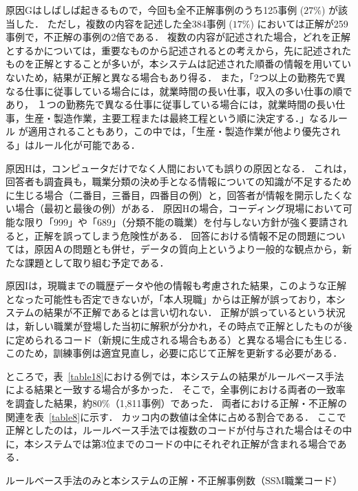 \documentclass[japanese]{jnlp_1.4}
\begin{document}
原因Gはしばしば起きるもので，今回も全不正解事例のうち125事例 ($27\%$) が該当した．
ただし，複数の内容を記述した全384事例 ($17\%$) においては正解が259事例で，不正解の事例の2倍である． 
複数の内容が記述された場合，どれを正解とするかについては，重要なものから記述されるとの考えから，先に記述されたものを正解とすることが多いが，本システムは記述された順番の情報を用いていないため，結果が正解と異なる場合もあり得る．
また，「2つ以上の勤務先で異なる仕事に従事している場合には，就業時間の長い仕事，収入の多い仕事の順であり， １つの勤務先で異なる仕事に従事している場合には，就業時間の長い仕事，生産・製造作業，主要工程または最終工程という順に決定する．」なるルール \cite{SSM95}が適用されることもあり，この中では，「生産・製造作業が他より優先される」はルール化が可能である．   

原因Hは，コンピュータだけでなく人間においても誤りの原因となる．
これは，回答者も調査員も，職業分類の決め手となる情報についての知識が不足するために生じる場合（二番目，三番目，四番目の例）と，回答者が情報を開示したくない場合（最初と最後の例）がある．
原因Hの場合，コーディング現場において可能な限り「999」や「689」（分類不能の職業）を付与しない方針が強く要請されると，正解を誤ってしまう危険性がある．
回答における情報不足の問題については，原因Ａの問題とも併せ，データの質向上というより一般的な観点から，新たな課題として取り組む予定である．

原因Iは，現職までの職歴データや他の情報も考慮された結果，このような正解となった可能性も否定できないが，「本人現職」からは正解が誤っており，本システムの結果が不正解であるとは言い切れない．
正解が誤っているという状況は，新しい職業が登場した当初に解釈が分かれ，その時点で正解としたものが後に定められるコード（新規に生成される場合もある）と異なる場合にも生じる．
このため，訓練事例は適宜見直し，必要に応じて正解を更新する必要がある．

ところで，表~\ref{table18}における例では，本システムの結果がルールベース手法による結果と一致する場合が多かった．
そこで，全事例における両者の一致率を調査した結果，約$80\%$（1,811事例）であった．
両者における正解・不正解の関連を表~\ref{table8}に示す．
カッコ内の数値は全体に占める割合である．
ここで正解としたのは，ルールベース手法では複数のコードが付与された場合はその中に，本システムでは第3位までのコードの中にそれぞれ正解が含まれる場合である．

\begin{table}[t]
\caption{ルールベース手法のみと本システムの正解・不正解事例数（SSM職業コード）}
\label{table8}

\end{table}
\end{document}
